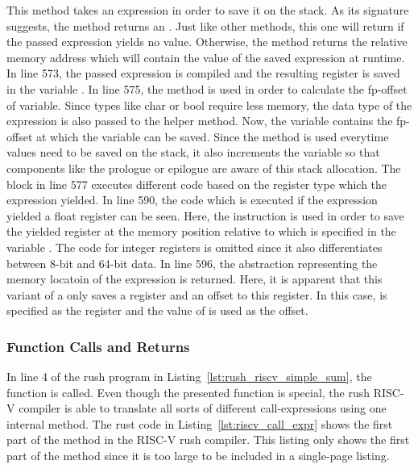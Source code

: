 This method takes an expression in order to save it on the stack.
As its signature suggests, the method returns an .
Just like other methods, this one will return  if the passed expression yields no value.
Otherwise, the method returns the relative memory address which will contain the value of the saved expression at runtime.
In line 573, the passed expression is compiled and the resulting register is saved in the variable .
In line 575, the  method is used in order to calculate the fp-offset of variable.
Since types like char or bool require less memory, the data type of the expression is also passed to the helper method.
Now, the  variable contains the fp-offset at which the variable can be saved.
Since the  method is used everytime values need to be saved on the stack,
it also increments the  variable so that components like the prologue or epilogue are aware of this stack allocation.
The  block in line 577 executes different code based on the register type which the expression yielded.
In line 590, the code which is executed if the expression yielded a float register can be seen.
Here, the  instruction is used in order to save the yielded register at the memory position relative to  which is specified in the variable .
The code for integer registers is omitted since it also differentiates between 8-bit and 64-bit data.
In line 596, the  abstraction representing the memory locatoin of the expression is returned.
Here, it is apparent that this variant of a  only saves a register and an offset to this register.
In this case,  is specified as the register and the value of  is used as the offset.

\subsubsection{Function Calls and Returns}

In line 4 of the rush program in Listing~\ref{lst:rush_riscv_simple_sum}, the  function is called.
Even though the presented  function is special, the rush RISC-V compiler is able to translate all sorts of different call-expressions using one internal method.
The rust code in Listing~\ref{lst:riscv_call_expr} shows the first part of the  method in the RISC-V rush compiler.
This listing only shows the first part of the method since it is too large to be included in a single-page listing.

